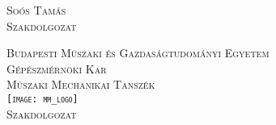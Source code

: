 \begin{titlepage}
	\cleardoublepage{}
	\begin{center}
		\scshape
		\large
		Soós Tamás
		\\
		Szakdolgozat
	\end{center}
	\thispagestyle{empty}
	
	\cleardoublepage{}
	\begin{center}
		\scshape
		\large
		Budapesti Műszaki és Gazdaságtudományi Egyetem
		\\
		Gépészmérnöki Kar
		\\
		Műszaki Mechanikai Tanszék 
		\\
		\vspace{2ex}
		\texttt{[image: mm\_logo]}
		\\
		Szakdolgozat	
	\end{center}
	\thispagestyle{empty}
	
	\cleardoublepage{}
	\thispagestyle{empty}
	\newcommand{\HRule}{\rule{\linewidth}{0.4pt}} %
	
	\center{} %
	

\end{titlepage}
